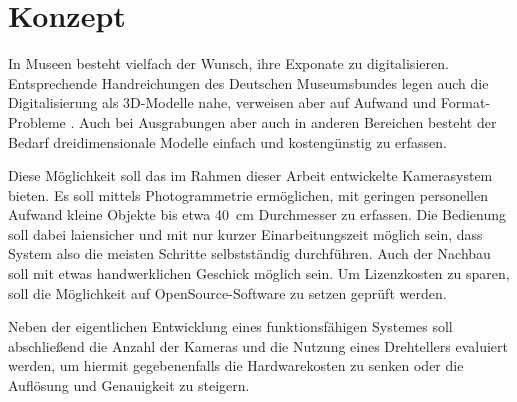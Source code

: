 \documentclass[./00PhotoBox.tex]{subfiles}
\begin{document}
\chapter{Konzept}
In Museen besteht vielfach der Wunsch, ihre Exponate zu digitalisieren. Entsprechende Handreichungen des Deutschen Museumsbundes legen auch die Digitalisierung als 3D-Modelle nahe, verweisen aber auf Aufwand und Format-Probleme \citep[S. 43]{handreichung_digital}.
Auch bei Ausgrabungen aber auch in anderen Bereichen besteht der Bedarf dreidimensionale Modelle einfach und kostengünstig zu erfassen.

Diese Möglichkeit soll das im Rahmen dieser Arbeit entwickelte Kamerasystem bieten. Es soll mittels Photogrammetrie ermöglichen, mit geringen personellen Aufwand kleine Objekte bis etwa 40~cm Durchmesser zu erfassen. Die Bedienung soll dabei laiensicher und mit nur kurzer Einarbeitungszeit möglich sein, dass System also die meisten Schritte selbstständig durchführen. Auch der Nachbau soll mit etwas handwerklichen Geschick möglich sein. Um Lizenzkosten zu sparen, soll die Möglichkeit auf OpenSource-Software zu setzen geprüft werden.

Neben der eigentlichen Entwicklung eines funktionsfähigen Systemes soll abschließend die Anzahl der Kameras und die Nutzung eines Drehtellers evaluiert werden, um hiermit gegebenenfalls die Hardwarekosten zu senken oder die Auflösung und Genauigkeit zu steigern.

\biblio
\end{document}
